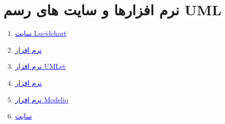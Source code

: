 \documentclass[]{article}
\begin{document}
\newpage

\section*{{\titr نرم افزارها و سایت های رسم UML}}

\begin{enumerate}

\item

\href{https://www.lucidchart.com/pages/}{\textcolor{blue}{\underline{سایت Lucidchart}}} 


\item

\href{https://products.office.com/en/visio/flowchart-software}{\textcolor{blue}{\underline{نرم افزار }}} 


\item

\href{https://www.umlet.com/changes.htm}{\textcolor{blue}{\underline{نرم افزار UMLet}}} 


\item

\href{https://online.visual-paradigm.com/}{\textcolor{blue}{\underline{نرم افزار }}} 


\item

\href{https://www.modelio.org/}{\textcolor{blue}{\underline{نرم افزار Modelio}}} 


\item

\href{https://app.diagrams.net/}{\textcolor{blue}{\underline{سایت }}} 



\end{enumerate}
\end{document}
